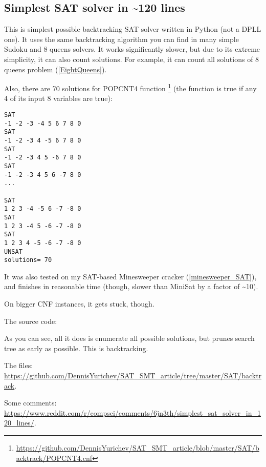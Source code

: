 \subsection{Simplest SAT solver in \textasciitilde{}120 lines}
\label{SAT_backtrack}

This is simplest possible backtracking SAT solver written in Python (not a \ac{DPLL} one).
It uses the same backtracking algorithm you can find in many simple Sudoku and 8 queens solvers.
It works significantly slower, but due to its extreme simplicity, it can also count solutions.
For example, it can count all solutions of 8 queens problem (\ref{EightQueens}).

Also, there are 70 solutions for POPCNT4 function
\footnote{\url{https://github.com/DennisYurichev/SAT_SMT_article/blob/master/SAT/backtrack/POPCNT4.cnf}}
(the function is true if any 4 of its input 8 variables are true):

\begin{lstlisting}
SAT
-1 -2 -3 -4 5 6 7 8 0
SAT
-1 -2 -3 4 -5 6 7 8 0
SAT
-1 -2 -3 4 5 -6 7 8 0
SAT
-1 -2 -3 4 5 6 -7 8 0
...

SAT
1 2 3 -4 -5 6 -7 -8 0
SAT
1 2 3 -4 5 -6 -7 -8 0
SAT
1 2 3 4 -5 -6 -7 -8 0
UNSAT
solutions= 70
\end{lstlisting}

It was also tested on my SAT-based Minesweeper cracker (\ref{minesweeper_SAT}),
and finishes in reasonable time (though, slower than MiniSat by a factor of \textasciitilde{}10).

On bigger \ac{CNF} instances, it gets stuck, though.

The source code:



As you can see, all it does is enumerate all possible solutions, but prunes search tree as early as possible.
This is backtracking.

The files: \url{https://github.com/DennisYurichev/SAT_SMT_article/tree/master/SAT/backtrack}.

Some comments: \url{https://www.reddit.com/r/compsci/comments/6jn3th/simplest_sat_solver_in_120_lines/}.

